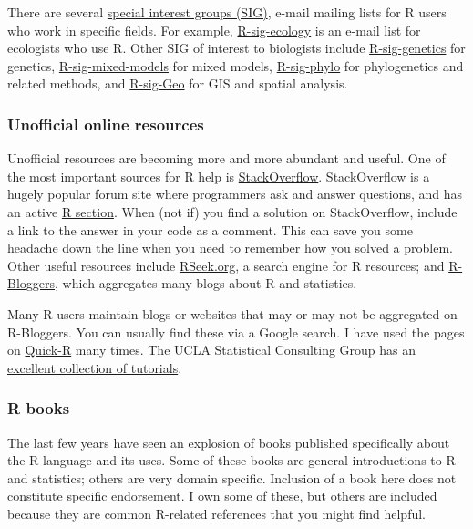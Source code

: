 \documentclass[
  13,
  letterpaper,
]{report}
\begin{document}
There are several \href{https://stat.ethz.ch/mailman/listinfo}{special
interest groups (SIG)}, e-mail mailing lists for R users who work in
specific fields. For example,
\href{https://stat.ethz.ch/mailman/listinfo/r-sig-ecology}{R-sig-ecology}
is an e-mail list for ecologists who use R. Other SIG of interest to
biologists include
\href{https://stat.ethz.ch/mailman/listinfo/r-sig-genetics}{R-sig-genetics}
for genetics,
\href{https://stat.ethz.ch/mailman/listinfo/r-sig-mixed-models}{R-sig-mixed-models}
for mixed models,
\href{https://stat.ethz.ch/mailman/listinfo/r-sig-phylo}{R-sig-phylo}
for phylogenetics and related methods, and
\href{https://stat.ethz.ch/mailman/listinfo/r-sig-geo}{R-sig-Geo} for
GIS and spatial analysis.

\subsubsection{Unofficial online resources}\label{sec-02-faq-help-unoff}

Unofficial resources are becoming more and more abundant and useful. One
of the most important sources for R help is
\href{https://stackoverflow.com}{StackOverflow}. StackOverflow is a
hugely popular forum site where programmers ask and answer questions,
and has an active \href{https://stackoverflow.com/questions/tagged/r}{R
section}. When (not if) you find a solution on StackOverflow, include a
link to the answer in your code as a comment. This can save you some
headache down the line when you need to remember how you solved a
problem. Other useful resources include
\href{https://rseek.org/}{RSeek.org}, a search engine for R resources;
and \href{https://www.r-bloggers.com/}{R-Bloggers}, which aggregates
many blogs about R and statistics.

Many R users maintain blogs or websites that may or may not be
aggregated on R-Bloggers. You can usually find these via a Google
search. I have used the pages on
\href{https://www.statmethods.net/}{Quick-R} many times. The UCLA
Statistical Consulting Group has an
\href{https://stats.oarc.ucla.edu/r/}{excellent collection of
tutorials}.

\subsubsection{R books}\label{sec-02-faq-help-books}

The last few years have seen an explosion of books published
specifically about the R language and its uses. Some of these books are
general introductions to R and statistics; others are very domain
specific. Inclusion of a book here does not constitute specific
endorsement. I own some of these, but others are included because they
are common R-related references that you might find helpful.
\end{document}
